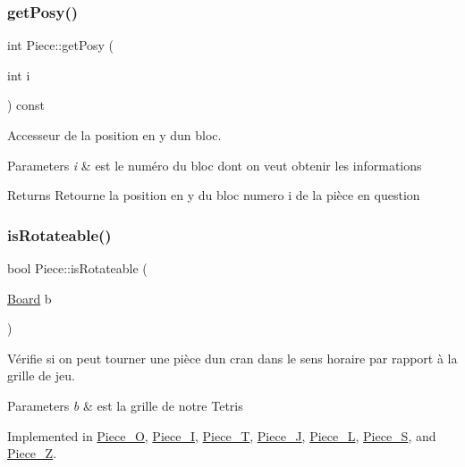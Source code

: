 \subsubsection{\texorpdfstring{get\+Posy()}{getPosy()}}
{\footnotesize\ttfamily int Piece\+::get\+Posy (\begin{DoxyParamCaption}\item[{int}]{i }\end{DoxyParamCaption}) const}



Accesseur de la position en y d\textquotesingle{}un bloc. 


\begin{DoxyParams}{Parameters}
{\em i} & est le numéro du bloc dont on veut obtenir les informations \\
\hline
\end{DoxyParams}
\begin{DoxyReturn}{Returns}
Retourne la position en y du bloc numero i de la pièce en question 
\end{DoxyReturn}
\mbox{\label{classPiece_a56cdf7f4234fe848a3e203b693b7a862}} 
\subsubsection{\texorpdfstring{is\+Rotateable()}{isRotateable()}}
{\footnotesize\ttfamily bool Piece\+::is\+Rotateable (\begin{DoxyParamCaption}\item[{\hyperlink{classBoard}{Board}}]{b }\end{DoxyParamCaption})\hspace{0.3cm}{\ttfamily [pure virtual]}}



Vérifie si on peut tourner une pièce d\textquotesingle{}un cran dans le sens horaire par rapport à la grille de jeu. 


\begin{DoxyParams}{Parameters}
{\em b} & est la grille de notre Tetris \\
\hline
\end{DoxyParams}


Implemented in \hyperlink{classPiece__O_af82900ecec4e7bd058d43825293d8bff}{Piece\+\_\+O}, \hyperlink{classPiece__I_aec103ce64d2702bf3dc5dbcdb8b450eb}{Piece\+\_\+I}, \hyperlink{classPiece__T_a64088f0140b870d178169e36460cd4de}{Piece\+\_\+T}, \hyperlink{classPiece__J_aee0abd6254be3a50a86ff5464bb459f8}{Piece\+\_\+J}, \hyperlink{classPiece__L_a34954ce32a27bdadb4d56ca7f3d82cba}{Piece\+\_\+L}, \hyperlink{classPiece__S_a725b9e7b154628e035bcc7ebd2a3ec9f}{Piece\+\_\+S}, and \hyperlink{classPiece__Z_aa70256d6f49dacad685a15c5ae8df06d}{Piece\+\_\+Z}.

